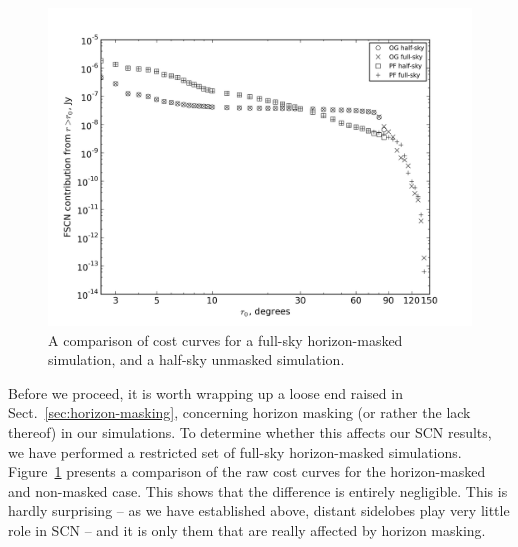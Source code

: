 \documentclass{aa}
\begin{document}
\begin{figure}
  \includegraphics[width=\columnwidth]{cc-horizonmasked}\hfill
\caption{\label{fig:cc-hm}A comparison of cost curves for a full-sky horizon-masked simulation, and a half-sky unmasked simulation.}
\end{figure}


Before we proceed, it is worth wrapping up a loose end raised in Sect.~\ref{sec:horizon-masking}, concerning horizon masking (or rather the lack thereof) in our simulations. To determine whether this affects our SCN results, we have performed a restricted set of full-sky horizon-masked simulations. Figure~\ref{fig:cc-hm} presents a comparison of the raw cost curves for the horizon-masked and non-masked case. This shows that the difference is entirely negligible. This is hardly surprising -- as we have established above, distant sidelobes play very little role in SCN -- and it is only them that are really affected by horizon masking.
\end{document}

